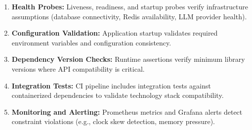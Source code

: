 \begin{enumerate}
    \item \textbf{Health Probes:} Liveness, readiness, and startup probes verify infrastructure assumptions (database connectivity, Redis availability, LLM provider health).
    
    \item \textbf{Configuration Validation:} Application startup validates required environment variables and configuration consistency.
    
    \item \textbf{Dependency Version Checks:} Runtime assertions verify minimum library versions where API compatibility is critical.
    
    \item \textbf{Integration Tests:} CI pipeline includes integration tests against containerized dependencies to validate technology stack compatibility.
    
    \item \textbf{Monitoring and Alerting:} Prometheus metrics and Grafana alerts detect constraint violations (e.g., clock skew detection, memory pressure).
\end{enumerate}
